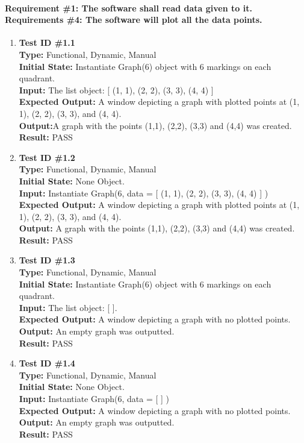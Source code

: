 \documentclass[12pt, titlepage]{article}
\begin{document}
	\paragraph{Requirement \#1: The software shall read data given to it. \\ Requirements \#4: The software will plot all the data points.}
		\begin{enumerate}
			\item{\textbf{Test ID \#1.1\\}}
			\textbf{Type:} Functional, Dynamic, Manual\\
			\textbf{Initial State:} Instantiate Graph(6) object with 6 markings on each quadrant.\\
			\textbf{Input:} The list object: [ (1, 1),  (2, 2), (3, 3), (4, 4) ]\\
			\textbf{Expected Output:} A window depicting a graph with plotted points at (1, 1), (2, 2), (3, 3), and (4, 4). \\
			\textbf{Output:}A graph with the points (1,1), (2,2), (3,3) and (4,4) was created.\\	
			\textbf{Result:} PASS

					
			\item{\textbf{Test ID \#1.2\\}}
			\textbf{Type:} Functional, Dynamic, Manual\\
			\textbf{Initial State:} None Object.\\
			\textbf{Input:} Instantiate Graph(6, data = [ (1, 1),  (2, 2), (3, 3), (4, 4) ] )\\
			\textbf{Expected Output:} A window depicting a graph with plotted points at (1, 1), (2, 2), (3, 3), and (4, 4). \\
			\textbf{Output:}	A graph with the points (1,1), (2,2), (3,3) and (4,4) was created.\\	
			\textbf{Result:} PASS
				
			\item{\textbf{Test ID \#1.3\\}}
			\textbf{Type:} Functional, Dynamic, Manual\\
			\textbf{Initial State:} Instantiate Graph(6) object with 6 markings on each quadrant.\\
			\textbf{Input:} The list object: [	].\\
			\textbf{Expected Output:} A window depicting a graph with no plotted points.\\
			\textbf{Output:}	An empty graph was outputted.\\
			\textbf{Result:} PASS

			\item{\textbf{Test ID \#1.4\\}}
			\textbf{Type:} Functional, Dynamic, Manual\\
			\textbf{Initial State:} None Object.\\
			\textbf{Input:} Instantiate Graph(6, data = [  ] )\\
			\textbf{Expected Output:} A window depicting a graph with no plotted points.\\
			\textbf{Output:}	An empty graph was outputted.\\
			\textbf{Result:} PASS
	\end{enumerate}
\end{document}
